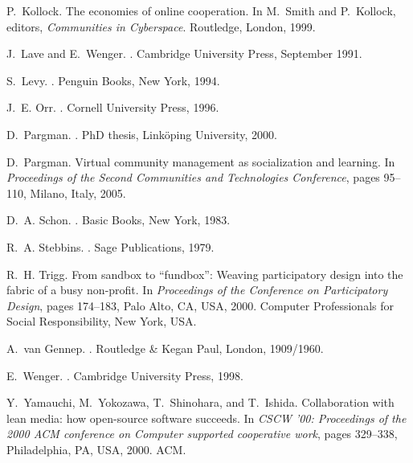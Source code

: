 \documentclass{sig-alt-release2}
\begin{document}
\begin{thebibliography}{10}
P.~Kollock.
\newblock The economies of online cooperation.
\newblock In M.~Smith and P.~Kollock, editors, {\em Communities in Cyberspace}.
  Routledge, London, 1999.

J.~Lave and E.~Wenger.
.
\newblock Cambridge University Press, September 1991.

S.~Levy.
.
\newblock Penguin Books, New York, 1994.

J.~E. Orr.
.
\newblock Cornell University Press, 1996.

D.~Pargman.
.
\newblock PhD thesis, Link\"oping University, 2000.

D.~Pargman.
\newblock Virtual community management as socialization and learning.
\newblock In {\em Proceedings of the Second Communities and Technologies
  Conference}, pages 95--110, Milano, Italy, 2005.

D.~A. Schon.
.
\newblock Basic Books, New York, 1983.

R.~A. Stebbins.
.
\newblock Sage Publications, 1979.

R.~H. Trigg.
\newblock From sandbox to ``fundbox'': Weaving participatory design into the
  fabric of a busy non-profit.
\newblock In {\em Proceedings of the Conference on Participatory Design}, pages
  174--183, Palo Alto, CA, USA, 2000. Computer Professionals for Social
  Responsibility, New York, USA.

A.~van Gennep.
.
\newblock Routledge \& Kegan Paul, London, 1909/1960.

E.~Wenger.
.
\newblock Cambridge University Press, 1998.

Y.~Yamauchi, M.~Yokozawa, T.~Shinohara, and T.~Ishida.
\newblock Collaboration with lean media: how open-source software succeeds.
\newblock In {\em CSCW '00: Proceedings of the 2000 ACM conference on Computer
  supported cooperative work}, pages 329--338, Philadelphia, PA, USA, 2000.
  ACM.

\end{thebibliography}

\balancecolumns
\end{document}
